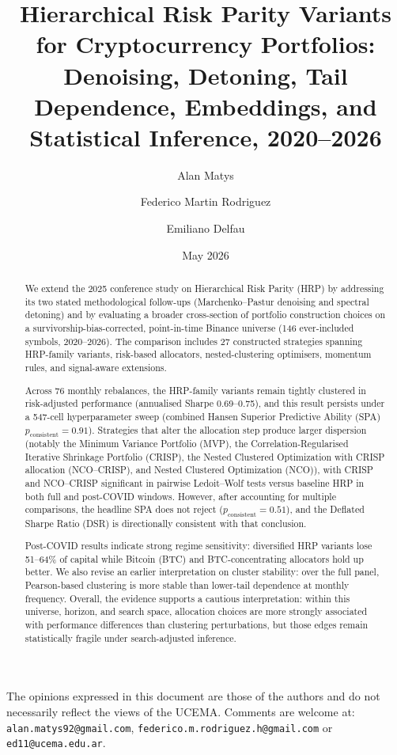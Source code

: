 \documentclass[11pt,a4paper]{article}
\title{\textbf{Hierarchical Risk Parity Variants for Cryptocurrency Portfolios:\\
       Denoising, Detoning, Tail Dependence, Embeddings, and Statistical Inference, 2020--2026}}
\author[1]{Alan Matys}
\author[1]{Federico Martin Rodriguez}
\author[1]{Emiliano Delfau}
\affil[1]{Universidad del CEMA \\ \texttt{alan.matys92@gmail.com}, \texttt{federico.m.rodriguez.h@gmail.com}, \texttt{ed11@ucema.edu.ar}}
\date{May 2026}
\begin{document}
\maketitle

\begin{center}
\small
The opinions expressed in this document are those of the authors and do
not necessarily reflect the views of the UCEMA. Comments are welcome at:
\texttt{alan.matys92@gmail.com}, \texttt{federico.m.rodriguez.h@gmail.com}
or \texttt{ed11@ucema.edu.ar}.
\end{center}

\begin{abstract}
\noindent
We extend the 2025 conference study on Hierarchical Risk Parity (HRP)
by addressing its two stated
methodological follow-ups (Marchenko--Pastur denoising and spectral
detoning) and by evaluating a broader cross-section of portfolio
construction choices on a survivorship-bias-corrected, point-in-time
Binance universe (146 ever-included symbols, 2020--2026). The comparison
includes 27 constructed strategies spanning HRP-family variants,
risk-based allocators, nested-clustering optimisers, momentum rules, and
signal-aware extensions.

Across 76 monthly rebalances, the HRP-family variants remain tightly
clustered in risk-adjusted performance (annualised Sharpe 0.69--0.75),
and this result persists under a 547-cell hyperparameter sweep
(combined Hansen Superior Predictive Ability (SPA)
$p_{\text{consistent}}=0.91$). Strategies that alter the
allocation step produce larger dispersion (notably the Minimum Variance
Portfolio (MVP), the Correlation-Regularised Iterative Shrinkage
Portfolio (CRISP), the Nested Clustered Optimization with CRISP
allocation (NCO--CRISP), and Nested Clustered Optimization (NCO)), with
CRISP and NCO--CRISP significant in pairwise
Ledoit--Wolf tests versus baseline HRP in both full and post-COVID
windows. However, after accounting for multiple comparisons, the
headline SPA does not reject ($p_{\text{consistent}}=0.51$), and
the Deflated Sharpe Ratio (DSR) is directionally consistent with that
conclusion.

Post-COVID results indicate strong regime sensitivity: diversified HRP
variants lose 51--64\% of capital while Bitcoin (BTC) and BTC-concentrating
allocators hold up better. We also revise an earlier interpretation on
cluster stability: over the full panel, Pearson-based clustering is more
stable than lower-tail dependence at monthly frequency. Overall, the
evidence supports a cautious interpretation: within this universe,
horizon, and search space, allocation choices are more strongly associated
with performance differences than clustering perturbations, but those edges
remain statistically fragile under search-adjusted inference.
\end{abstract}
\end{document}
